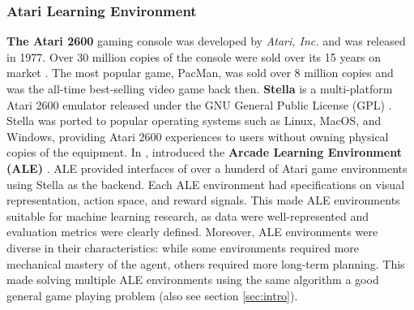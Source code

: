 \subsubsection{Atari Learning Environment} \label{sec:ale}
\textbf{The Atari 2600} gaming console was developed by \textit{Atari, Inc.} and was released in 1977.
Over 30 million copies of the console were sold over its 15 years on market \cite{Atari2600__2022}.
The most popular game, PacMan, was sold over 8 million copies and was the all-time best-selling video game back then.
\textbf{Stella} is a multi-platform Atari 2600 emulator released under the GNU General Public License (GPL) \cite{StellaMultiPlatformAtari__}.
Stella was ported to popular operating systems such as Linux, MacOS, and Windows, providing Atari 2600 experiences to users without owning physical copies of the equipment.
In \citeyear{ArcadeLearningEnvironment_Bellemare.Naddaf.ea_2013b}, \citeauthor{ArcadeLearningEnvironment_Bellemare.Naddaf.ea_2013b} introduced the \textbf{Arcade Learning Environment (ALE)} \cite{ArcadeLearningEnvironment_Bellemare.Naddaf.ea_2013b}.
ALE provided interfaces of over a hunderd of Atari game environments using Stella as the backend.
Each ALE environment had specifications on visual representation, action space, and reward signals.
This made ALE environments suitable for machine learning research,
as data were well-represented and evaluation metrics were clearly defined.
Moreover, ALE environments were diverse in their characteristics: while some environments required more mechanical mastery of the agent, others required more long-term planning.
This made solving multiple ALE environments using the same algorithm a good general game playing problem (also see section \ref{sec:intro}).

